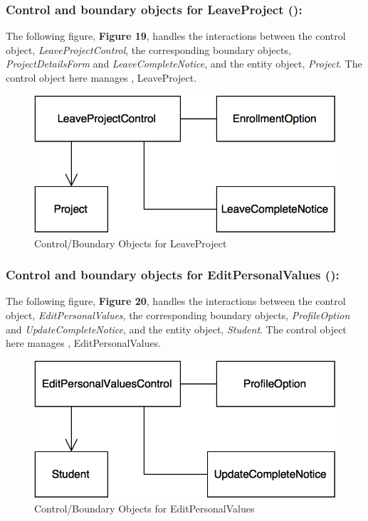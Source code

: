 \documentclass[12pt,letterpaper]{article}
\begin{document}
\newpage{}

\subsubsection*{Control and boundary objects for LeaveProject (\leaveproject{}):}

The following figure, {\bf Figure 19}, handles the interactions between the control object, {\it LeaveProjectControl}, the corresponding boundary objects, 
{\it ProjectDetailsForm} and {\it LeaveCompleteNotice}, and the entity object, {\it Project}. The control object here manages \leaveproject{}, LeaveProject.

\begin{figure}[H]
	\centering{}
	\includegraphics[scale=0.37]{imgs/cbod/leave-project.png}
	\caption{Control/Boundary Objects for LeaveProject}    
\end{figure}

\subsubsection*{Control and boundary objects for EditPersonalValues (\editpersonalvalues{}):}

The following figure, {\bf Figure 20}, handles the interactions between the control object, {\it EditPersonalValues}, the corresponding boundary objects, 
{\it ProfileOption} and {\it UpdateCompleteNotice}, and the entity object, {\it Student}. The control object here manages \editpersonalvalues{}, EditPersonalValues.

\begin{figure}[H]
	\centering{}
	\includegraphics[scale=0.37]{imgs/cbod/edit-personal-values.png}
	\caption{Control/Boundary Objects for EditPersonalValues}    
\end{figure}
\end{document}
